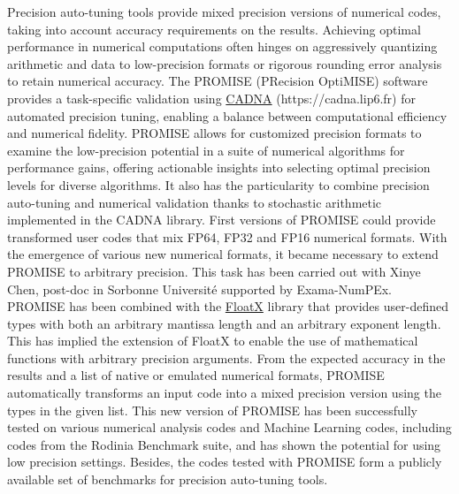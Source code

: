 Precision auto-tuning tools provide mixed precision versions of
numerical codes, taking into account accuracy requirements on the results. 
Achieving optimal performance in numerical computations often hinges on aggressively quantizing arithmetic and data to low-precision formats or rigorous rounding error analysis to retain numerical accuracy. The PROMISE (PRecision OptiMISE) software provides a task-specific validation using  \href{https://cadna.lip6.fr/}{CADNA}  (https://cadna.lip6.fr) for automated precision tuning, enabling a balance between computational efficiency and numerical fidelity. PROMISE allows for customized precision formats to examine the low-precision potential in a suite of numerical algorithms for performance gains, offering actionable insights into selecting optimal precision levels for diverse algorithms.
It also has the particularity to combine precision auto-tuning and numerical validation thanks to stochastic arithmetic implemented in the CADNA library. 
First versions of PROMISE 
could provide transformed user codes that mix FP64, FP32 and FP16 numerical formats. 
With the emergence of various new numerical formats, it became necessary to extend PROMISE to arbitrary precision. This task has been carried out with
Xinye Chen, post-doc in Sorbonne Université supported by Exama-NumPEx. 
PROMISE has been combined with the \href{https://github.com/oprecomp/FloatX}{FloatX} library that provides user-defined types with both an arbitrary mantissa length and an arbitrary exponent length. 
This has implied the extension of FloatX to enable the use of mathematical functions with arbitrary precision arguments. 
From the expected accuracy in the results and a list of native or emulated numerical formats, PROMISE automatically transforms an input code into a mixed precision version using the types in the given list. This new version of PROMISE has been successfully tested on various numerical analysis
codes and Machine Learning codes, including codes from the Rodinia Benchmark suite, and has shown the potential for using low precision settings. 
Besides, the codes tested with PROMISE form a publicly available set of benchmarks for precision auto-tuning tools.




